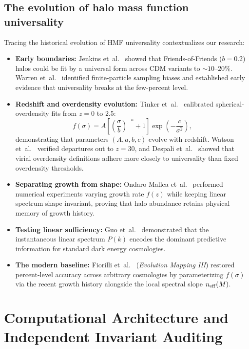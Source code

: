 \documentclass[11pt]{article}
\begin{document}
\subsection{The evolution of halo mass function universality}
Tracing the historical evolution of HMF universality contextualizes our research:
\begin{itemize}
\item \textbf{Early boundaries:} Jenkins et~al.~\cite{JenkinsEtAl2001} showed that Friends-of-Friends ($b=0.2$) halos could be fit by a universal form across CDM variants to $\sim 10\text{--}20\%$. Warren et~al.~\cite{WarrenEtAl2006} identified finite-particle sampling biases and established early evidence that universality breaks at the few-percent level.
\item \textbf{Redshift and overdensity evolution:} Tinker et~al.~\cite{TinkerEtAl2008} calibrated spherical-overdensity fits from $z=0$ to $2.5$:
\begin{equation}
f(\sigma) = A\left[ \left(\frac{\sigma}{b}\right)^{-a} + 1 \right]\exp\left(-\frac{c}{\sigma^2}\right),
\end{equation}
demonstrating that parameters $(A, a, b, c)$ evolve with redshift. Watson et~al.~\cite{WatsonEtAl2013} verified departures out to $z=30$, and Despali et~al.~\cite{DespaliEtAl2016} showed that virial overdensity definitions adhere more closely to universality than fixed overdensity thresholds.
\item \textbf{Separating growth from shape:} Ondaro-Mallea et~al.~\cite{OndaroMalleaEtAl2022} performed numerical experiments varying growth rate $f(z)$ while keeping linear spectrum shape invariant, proving that halo abundance retains physical memory of growth history.
\item \textbf{Testing linear sufficiency:} Guo et~al.~\cite{GuoEtAl2024} demonstrated that the instantaneous linear spectrum $P(k)$ encodes the dominant predictive information for standard dark energy cosmologies.
\item \textbf{The modern baseline:} Fiorilli et~al.~\cite{FiorilliEtAl2026} (\emph{Evolution Mapping III}) restored percent-level accuracy across arbitrary cosmologies by parameterizing $f(\sigma)$ via the recent growth history alongside the local spectral slope $n_{\rm eff}(M)$.
\end{itemize}

\section{Computational Architecture and Independent Invariant Auditing}
\label{sec:auditing}
\end{document}
